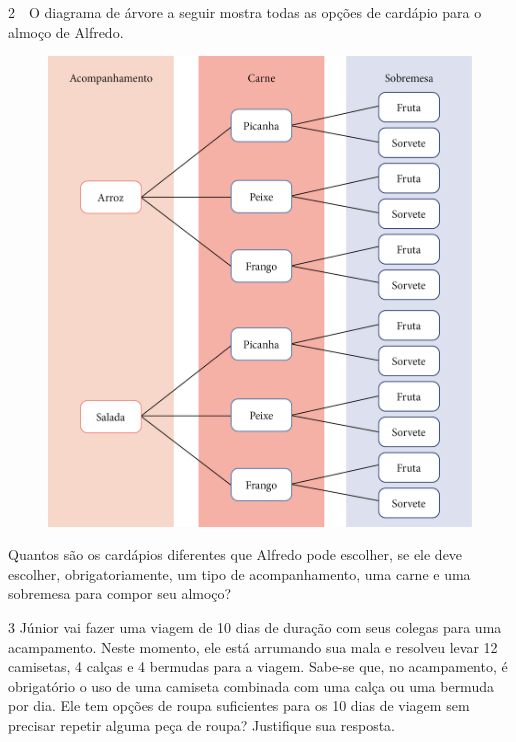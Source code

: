\num{2}　O diagrama de árvore a seguir mostra todas as opções de cardápio para o
almoço de Alfredo.

\begin{figure}[htpb!]
\centering
\includegraphics[width=.8\textwidth]{media/image73.png}
\end{figure}

Quantos são os cardápios diferentes que Alfredo pode escolher, se
ele deve escolher, obrigatoriamente, um tipo de acompanhamento, uma
carne e uma sobremesa para compor seu almoço?

\begin{mdframed}[linewidth=2pt,linecolor=salmao,roundcorner=2pt]
\vspace{2cm}
\end{mdframed}

\num{3} Júnior vai fazer uma viagem de 10 dias de duração com seus colegas para
uma acampamento. Neste momento, ele está arrumando sua mala e resolveu
levar 12 camisetas, 4 calças e 4 bermudas para a viagem. Sabe-se que, no
acampamento, é obrigatório o uso de uma camiseta combinada com uma calça
ou uma bermuda por dia. Ele tem opções de roupa suficientes para os 10 dias de viagem sem
precisar repetir alguma peça de roupa? Justifique sua resposta.

\begin{mdframed}[linewidth=2pt,linecolor=salmao,roundcorner=2pt]
\vspace{2cm}
\end{mdframed}

